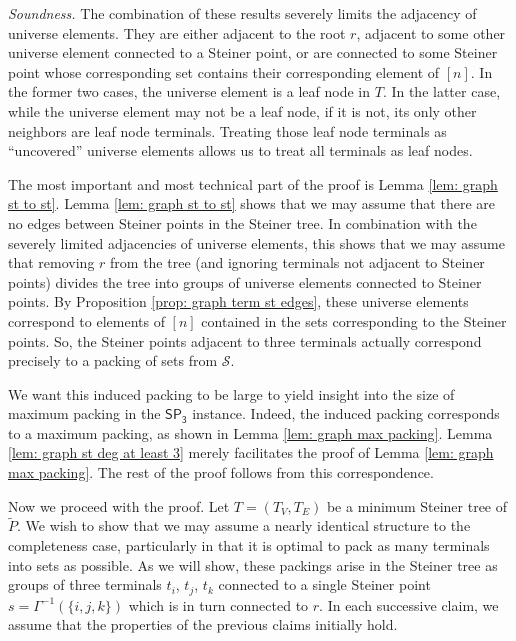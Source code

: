 \documentclass{article}\providecommand{\DeclareRedundantLanguages}[2]{}\usepackage[a4paper,margin=20mm]{geometry}
\newcommand{\1}{\textbf{1}}
\newcommand{\setpT}{$\mathsf{SP_3}$\xspace}
\renewcommand{\tilde}{\widetilde}
\begin{document}
\begin{paragraph}{\textit{Soundness.}}
The combination of these results severely limits the adjacency of universe elements. They are either adjacent to the root $r$, adjacent to some other universe element connected to a Steiner point, or are connected to some Steiner point whose corresponding set contains their corresponding element of $[n]$. In the former two cases, the universe element is a leaf node in $T$. In the latter case, while the universe element may not be a leaf node, if it is not, its only other neighbors are leaf node terminals. Treating those leaf node terminals as ``uncovered'' universe elements allows us to treat all terminals as leaf nodes.

The most important and most technical part of the proof is Lemma \ref{lem: graph st to st}. Lemma \ref{lem: graph st to st} shows that we may assume that there are no edges between Steiner points in the Steiner tree. In combination with the severely limited adjacencies of universe elements, this shows that we may assume that removing $r$ from the tree (and ignoring terminals not adjacent to Steiner points) divides the tree into groups of universe elements connected to Steiner points. By Proposition \ref{prop: graph term st edges}, these universe elements correspond to elements of $[n]$ contained in the sets corresponding to the Steiner points. So, the Steiner points adjacent to three terminals actually correspond precisely to a packing of sets from $\mathcal{S}$.

We want this induced packing to be large to yield insight into the size of maximum packing in the \setpT instance. Indeed, the induced packing corresponds to a maximum packing, as shown in Lemma \ref{lem: graph max packing}. Lemma \ref{lem: graph st deg at least 3} merely facilitates the proof of Lemma \ref{lem: graph max packing}. The rest of the proof follows from this correspondence.

 Now we proceed with the proof. Let $T = (T_V, T_E)$ be a minimum Steiner tree of $\tilde{P}$.  We wish to show that we may assume a nearly identical structure to the completeness case, particularly in that it is optimal to pack as many terminals into sets as possible. As we will show, these packings arise in the Steiner tree as groups of three terminals $t_i$, $t_j$, $t_k$ connected to a single Steiner point $s = \Gamma^{-1}(\{i,j,k\})$ which is in turn connected to $r$. In each successive claim, we assume that the properties of the previous claims initially hold.


\end{paragraph}
\end{document}
